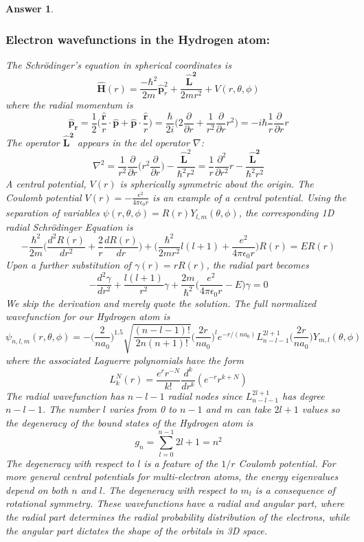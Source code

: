 \documentclass[a4paper]{article}
\newtheorem{ans}{Answer}[subsection]
\theoremstyle{new}
\begin{document}
\begin{ans}\leavevmode
\subsubsection*{Electron wavefunctions in the Hydrogen atom:}
The Schr\"{o}dinger's equation in spherical coordinates is
$$\mathbf{\hat{H}}(r)=\frac{-\hbar^2}{2m}\mathbf{\hat{p}}_r^2+\frac{\mathbf{\hat{L}^2}}{2mr^2}+V(r,\theta,\phi)$$
where the radial momentum is
$$\mathbf{\hat{p}_r}=\frac{1}{2}\bigg(\frac{\mathbf{\hat{r}}}{r}\cdot\mathbf{\hat{p}}+\mathbf{\hat{p}}\cdot\frac{\mathbf{\hat{r}}}{r}\bigg)=\frac{\hbar}{2i}\bigg(2\frac{\partial}{\partial r}+\frac{1}{r^2}\frac{\partial}{\partial r}r^2\bigg)=-i\hbar\frac{1}{r}\frac{\partial}{\partial r}r$$
The operator $\mathbf{\hat{L}^2}$ appears in the del operator $\nabla$:
$$\nabla^2=\frac{1}{r^2}\frac{\partial}{\partial r}\bigg(r^2\frac{\partial}{\partial r}\bigg)-\frac{\mathbf{\hat{L}}^2}{\hbar^2r^2}=\frac{1}{r}\frac{\partial^2}{\partial r^2}r-\frac{\mathbf{\hat{L}^2}}{\hbar^2r^2}$$
A central potential, $V(r)$ is spherically symmetric about the origin. The Coulomb potential  $V(r)=-\frac{e^2}{4\pi\epsilon_0r}$ is an example of a central potential. Using the separation of variables $\psi(r,\theta,\phi)=R(r)Y_{l,m}(\theta,\phi)$, the corresponding 1D radial Schr\"{o}dinger Equation is
$$-\frac{\hbar^2}{2m}\bigg(\frac{d^2R(r)}{dr^2}+\frac{2}{r}\frac{dR(r)}{dr}\bigg)+\bigg(\frac{\hbar^2}{2mr^2}l(l+1)+\frac{e^2}{4\pi\epsilon_0r}\bigg)R(r)=ER(r)$$
Upon a further substitution of $\gamma(r)=rR(r)$, the radial part becomes
$$-\frac{d^2\gamma}{dr^2}+\frac{l(l+1)}{r^2}\gamma+\frac{2m}{\hbar^2}\bigg(\frac{e^2}{4\pi\epsilon_0r}-E\bigg)\gamma=0$$
We skip the derivation and merely quote the solution. The full normalized wavefunction for our Hydrogen atom is
$$\psi_{n,l,m}(r,\theta,\phi)
=-\bigg(\frac{2}{na_0}\bigg)^{1.5}\sqrt{\frac{(n-l-1)!}{2n(n+1)!}}\bigg(\frac{2r}{na_0}\bigg)^le^{-r/(na_0)}L_{n-l-1}^{2l+1}\bigg(\frac{2r}{na_0}\bigg)Y_{m,l}(\theta,\phi)$$
where the associated Laguerre polynomials have the form
$$L_k^N(r)=\frac{e^rr^{-N}}{k!}\frac{d^k}{dr^k}(e^{-r}r^{k+N})$$
The radial wavefunction has $n-l-1$ radial nodes since $L_{n-l-1}^{2l+1}$ has degree $n-l-1$. The number $l$ varies from 0 to $n-1$ and $m$ can take $2l+1$ values so the degeneracy of the bound states of the Hydrogen atom is
$$g_n=\sum_{l=0}^{n-1}2l+1=n^2$$
The degeneracy with respect to $l$ is a feature of the $1/r$ Coulomb potential. For more general central potentials for multi-electron atoms, the energy eigenvalues depend on both $n$ and $l$. The degeneracy with respect to $m_l$ is a consequence of rotational symmetry. These wavefunctions have a radial and angular part, where the radial part determines the radial probability distribution of the electrons, while the angular part dictates the shape of the orbitals in 3D space.\\[5pt]

\end{ans}
\end{document}
